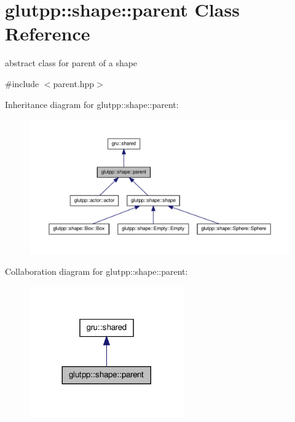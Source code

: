\hypertarget{classglutpp_1_1shape_1_1parent}{\section{glutpp\-:\-:shape\-:\-:parent \-Class \-Reference}
\label{classglutpp_1_1shape_1_1parent}
}


abstract class for parent of a shape  




{\ttfamily \#include $<$parent.\-hpp$>$}



\-Inheritance diagram for glutpp\-:\-:shape\-:\-:parent\-:\nopagebreak
\begin{figure}[H]
\begin{center}
\leavevmode
\includegraphics[width=350pt]{classglutpp_1_1shape_1_1parent__inherit__graph}
\end{center}
\end{figure}


\-Collaboration diagram for glutpp\-:\-:shape\-:\-:parent\-:\nopagebreak
\begin{figure}[H]
\begin{center}
\leavevmode
\includegraphics[width=188pt]{classglutpp_1_1shape_1_1parent__coll__graph}
\end{center}
\end{figure}
